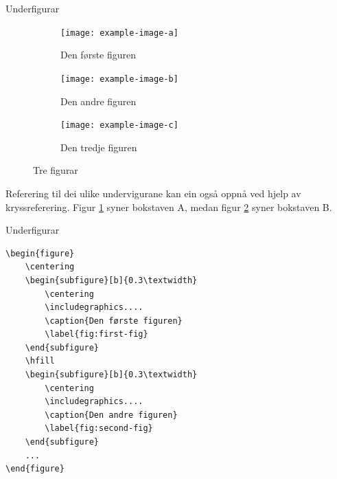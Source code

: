 \begin{frame}[containsverbatim]{Underfigurar}
	
	\begin{figure}
		\centering
		\begin{subfigure}[b]{0.3\textwidth}
			\centering
			\texttt{[image: example-image-a]}
			\caption{Den første figuren}
			\label{fig:first-fig}
		\end{subfigure}
		\hfill
		\begin{subfigure}[b]{0.3\textwidth}
			\centering
			\texttt{[image: example-image-b]}
			\caption{Den andre figuren}
			\label{fig:second-fig}
		\end{subfigure}
		\hfill
		\begin{subfigure}[b]{0.3\textwidth}
			\centering
			\texttt{[image: example-image-c]}
			\caption{Den tredje figuren}
			\label{fig:third-fig}
		\end{subfigure}
		\caption{Tre figurar}
		\label{fig:three-figures}
	\end{figure}
	
	Referering til dei ulike undervigurane kan ein også oppnå ved hjelp av kryssreferering. Figur \ref{fig:first-fig} syner bokstaven A, medan figur \ref{fig:second-fig} syner bokstaven B.
	
\end{frame}


\begin{frame}[containsverbatim]{Underfigurar}
	
	\begin{verbatim}
\begin{figure}
	\centering
	\begin{subfigure}[b]{0.3\textwidth}
		\centering
		\includegraphics....
		\caption{Den første figuren}
		\label{fig:first-fig}
	\end{subfigure}
	\hfill
	\begin{subfigure}[b]{0.3\textwidth}
		\centering
		\includegraphics....
		\caption{Den andre figuren}
		\label{fig:second-fig}
	\end{subfigure}
	...
\end{figure}
	\end{verbatim}
	
	
	
	
\end{frame}


